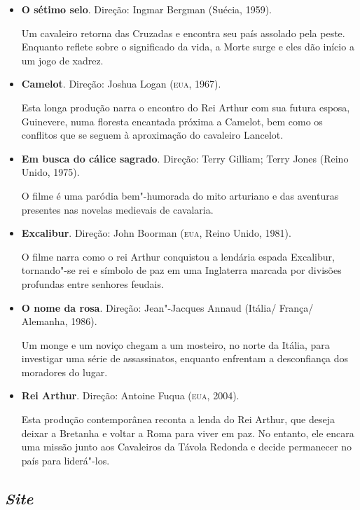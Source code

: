 \documentclass[11pt]{extarticle}
\begin{document}
\begin{itemize}
\item\textbf{O sétimo selo}. Direção: Ingmar Bergman (Suécia, 1959).

  Um cavaleiro retorna das Cruzadas e encontra seu país assolado pela
  peste. Enquanto reflete sobre o significado da vida, a Morte surge e
  eles dão início a um jogo de xadrez.

\item\textbf{Camelot}. Direção: Joshua Logan (\textsc{eua}, 1967).

  Esta longa produção narra o encontro do Rei Arthur com sua futura
  esposa, Guinevere, numa floresta encantada próxima a Camelot, bem como
  os conflitos que se seguem à aproximação do cavaleiro Lancelot.

\item\textbf{Em busca do cálice sagrado}. Direção: Terry Gilliam; ‎Terry
Jones (Reino Unido, 1975).

  O filme é uma paródia bem"-humorada do mito arturiano e das aventuras
  presentes nas novelas medievais de cavalaria.

\item\textbf{Excalibur}. Direção: John Boorman (\textsc{eua}, Reino Unido, 1981).

  O filme narra como o rei Arthur conquistou a lendária espada
  Excalibur, tornando"-se rei e símbolo de paz em uma Inglaterra marcada
  por divisões profundas entre senhores feudais.

\item\textbf{O nome da rosa}. Direção: Jean"-Jacques Annaud (Itália/ França/
Alemanha, 1986).

  Um monge e um noviço chegam a um mosteiro, no norte da Itália, para
  investigar uma série de assassinatos, enquanto enfrentam a
  desconfiança dos moradores do lugar.

\item\textbf{Rei Arthur}. Direção: Antoine Fuqua (\textsc{eua}, 2004).

  Esta produção contemporânea reconta a lenda do Rei Arthur, que deseja
  deixar a Bretanha e voltar a Roma para viver em paz. No entanto, ele
  encara uma missão junto aos Cavaleiros da Távola Redonda e decide
  permanecer no país para liderá"-los.
\end{itemize}

\subsection{\emph{Site}}
\end{document}
